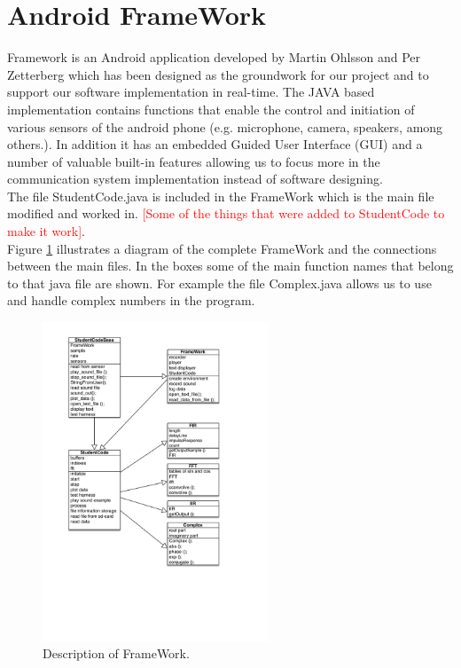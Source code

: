 \documentclass[12pt,a4paper,openright]{report}
\begin{document}
\section{Android FrameWork}

Framework is an Android application developed by Martin Ohlsson and Per Zetterberg which has been designed as the groundwork for our project and to support our software implementation in real-time. The JAVA based implementation contains functions that enable the control and initiation of various sensors of the android phone (e.g. microphone, camera, speakers, among others.). In addition it has an embedded  Guided User Interface (GUI) and a number of valuable built-in features allowing us to focus more in the communication system implementation instead of software designing. \\
The file StudentCode.java is included in the FrameWork which is the main file modified and worked in. \textcolor{red}{[Some of the things that were added to StudentCode to make it work]}.\\

Figure \ref{fig:FrameWorkPicture} illustrates a diagram of the complete FrameWork and the connections between the main files. In the boxes some of the main function names that belong to that java file are shown. For example the file Complex.java \cite{ComplexJavaRef} allows us to use and handle complex numbers in the program. 




 \begin{figure}[H]
  \centering
    \includegraphics[width=0.6\textwidth]{UmlScheme.pdf}
    \caption[Description of FrameWork]{Description of FrameWork. }
    \label{fig:FrameWorkPicture}
\end{figure}
\end{document}
